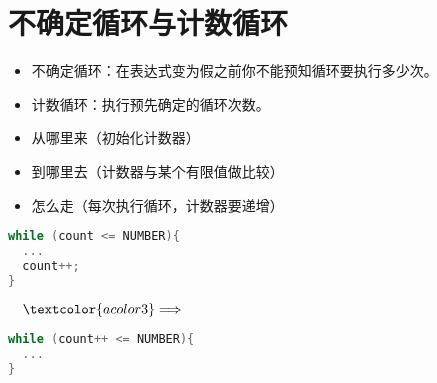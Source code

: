 \section{不确定循环与计数循环}
\begin{frame}[fragile]\ft{\secname}
\begin{itemize}
\item 不确定循环：在表达式变为假之前你不能预知循环要执行多少次。\\[0.1in]
\item 计数循环：执行预先确定的循环次数。
\end{itemize}
\end{frame}


\begin{frame}[fragile]\ft{\secname}



\end{frame}

\begin{frame}[fragile]
\begin{itemize}
\item 从哪里来（初始化计数器）\\[0.1in]
\item 到哪里去（计数器与某个有限值做比较）\\[0.1in]
\item 怎么走（每次执行循环，计数器要递增）
\end{itemize}
\end{frame}

\begin{frame}[fragile]
\begin{minipage}{.6\textwidth}
\begin{lstlisting}[language=c,backgroundcolor=\color{red!10}]
while (count <= NUMBER){
  ...
  count++;
}
\end{lstlisting}
\end{minipage}
$~~~\textcolor{acolor3}\Longrightarrow~~~$
\begin{minipage}{.6\textwidth}
\begin{lstlisting}[language=c,backgroundcolor=\color{red!10}]
while (count++ <= NUMBER){
  ...
}
\end{lstlisting}
\end{minipage}
\end{frame}


